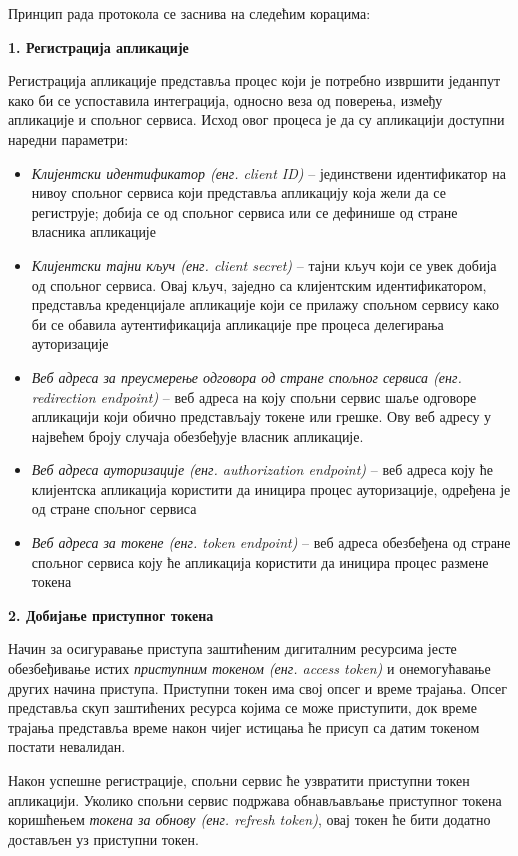 \documentclass[12pt,oneside]{memoir}
\begin{document}
Принцип рада протокола се заснива на следећим корацима:

\textbf{1. Регистрација апликације}

Регистрација апликације представља процес који је потребно извршити једанпут како би се успоставила интеграција, односно веза од поверења, између апликације и спољног сервиса. Исход овог процеса је да су апликацији доступни наредни параметри:

\begin{itemize}[-]
    \item \textit{Клијентски идентификатор (енг. client ID)} -- јединствени идентификатор на нивоу спољног сервиса који представља апликацију која жели да се региструје; добија се од спољног сервиса или се дефинише од стране власника апликације 
    \item \textit{Клијентски тајни кључ (енг. client secret)} -- тајни кључ који се увек добија од спољног сервиса. Овај кључ, заједно са клијентским идентификатором, представља креденцијале апликације који се прилажу спољном сервису како би се обавила аутентификација апликације пре процеса делегирања ауторизације
    \item \textit{Веб адреса за преусмерење одговора од стране спољног сервиса (енг. re\-di\-rec\-tion endpoint)} -- веб адреса на коју спољни сервис шаље одговоре апликацији који обично представљају токене или грешке. Ову веб адресу у највећем броју случаја обезбеђује власник апликације.
    \item \textit{Веб адреса ауторизације (енг. authorization endpoint)} -- веб адреса коју ће клијентска апликација користити да иницира процес ауторизације, одређена је од стране спољног сервиса
    \item \textit{Веб адреса за токене (енг. token endpoint)} -- веб адреса обезбеђена од стране спољног сервиса коју ће апликација користити да иницира процес размене токена
\end{itemize}

\textbf{2. Добијање приступног токена}

Начин за осигуравање приступа заштићеним дигиталним ресурсима јесте обезбеђивање истих 
\textit{приступним токеном (енг. access token)} и онемогућавање других начина приступа. 
Приступни токен има свој опсег и време трајања. Опсег представља скуп заштићених ресурса 
којима се може приступити, док време трајања представља време након чијег истицања ће присуп са датим токеном постати невалидан.

Након успешне регистрације, спољни сервис ће узвратити приступни токен апликацији.
Уколико спољни сервис подржава обнављављање приступног токена коришћењем 
\textit{токена за обнову (енг. refresh token)}, овај токен ће бити додатно достављен уз приступни токен.
 
\end{document}
